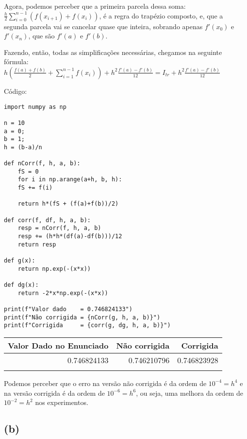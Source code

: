 \documentclass[11pt]{article}
\begin{document}
Agora, podemos perceber que a primeira parcela dessa soma: \\
\(\displaystyle\frac{h}{2}\sum_{i=0}^{n-1}(f(x_{i+1})+f(x_i))\),
é a regra do trapézio composto, e, que a segunda parcela vai se cancelar quase que inteira, sobrando apenas 
\(f'(x_0)\) e \(f'(x_n)\), que são \(f'(a)\) e \(f'(b)\). 

Fazendo, então, todas as simplificações necessárias, chegamos na seguinte fórmula: \\

\(\displaystyle h(\frac{f(a)+f(b)}{2}+\sum_{i=1}^{n-1}f(x_i)) + h^2\frac{f'(a)-f'(b)}{12} = I_{tr} + h^2\frac{f'(a)-f'(b)}{12}\)

\newpage

Código: 
\begin{verbatim}
import numpy as np

n = 10
a = 0;
b = 1;
h = (b-a)/n

def nCorr(f, h, a, b):
    fS = 0
    for i in np.arange(a+h, b, h):
	fS += f(i)

    return h*(fS + (f(a)+f(b))/2)

def corr(f, df, h, a, b):
    resp = nCorr(f, h, a, b)
    resp += (h*h*(df(a)-df(b)))/12
    return resp

def g(x):
    return np.exp(-(x*x))

def dg(x):
    return -2*x*np.exp(-(x*x))

print(f"Valor dado    = 0.746824133")
print(f"Não corrigida = {nCorr(g, h, a, b)}")
print(f"Corrigida     = {corr(g, dg, h, a, b)}")
\end{verbatim}

\begin{center}
\begin{tabular}{rrr}
Valor Dado no Enunciado & Não corrigida & Corrigida\\
\hline
0.746824133 & 0.746210796 & 0.746823928\\
 &  & \\
\end{tabular}
\end{center}

Podemos perceber que o erro na versão não corrigida é da ordem de \(10^{-4} = h^4\) e
na versão corrigida é da ordem de \(10^{-6} = h^6\), ou seja, uma melhora da ordem de \(10^{-2} = h^2\) nos experimentos.

\subsection{(b)}
\label{sec:org03ea26c}
\end{document}
